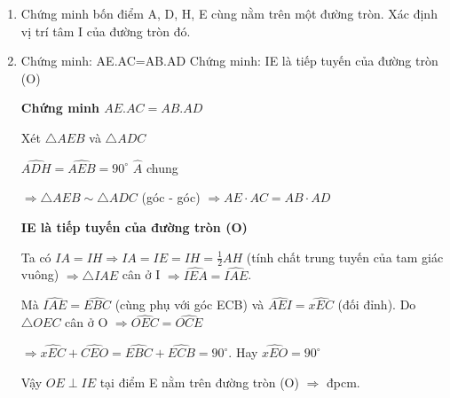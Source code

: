\begin{ex}
{\begin{center}
		\end{center}
		\begin{enumerate}
			\item[a.] Chứng minh bốn điểm A, D, H, E cùng nằm trên một đường tròn. Xác định vị trí tâm I của đường tròn đó.
			\item[b.] Chứng minh: AE.AC=AB.AD 	Chứng minh: IE là tiếp tuyến của đường tròn (O)
			
			\textbf{Chứng minh $AE.AC=AB.AD$}
			
			Xét $\triangle AEB$ và $\triangle ADC$
			
			$\widehat{ADH} = \widehat{AEB} = 90^\circ$
			$\widehat{A}$ chung
			
			$\Rightarrow \triangle AEB \sim \triangle ADC$ (góc - góc)
			$\Rightarrow AE \cdot AC = AB \cdot AD$
			
		
			\textbf{IE là tiếp tuyến của đường tròn (O)}
			
			Ta có $IA=IH \Rightarrow IA=IE=IH = \frac{1}{2}AH$ (tính chất trung tuyến của tam giác vuông) $\Rightarrow \triangle IAE$ cân ở I $\Rightarrow \widehat{IEA} = \widehat{IAE}$.
			
			Mà $\widehat{IAE} = \widehat{EBC}$ (cùng phụ với góc ECB) và $\widehat{AEI} = \widehat{xEC}$ (đối đỉnh). Do $\triangle OEC$ cân ở O $\Rightarrow \widehat{OEC} = \widehat{OCE}$
			
			$\Rightarrow \widehat{xEC} + \widehat{CEO} = \widehat{EBC} + \widehat{ECB} = 90^\circ$. Hay $\widehat{xEO} = 90^\circ$
			
			Vậy $OE \perp IE$ tại điểm E nằm trên đường tròn (O) $\Rightarrow$ đpcm.
			
		\end{enumerate}
		}
\end{ex}

